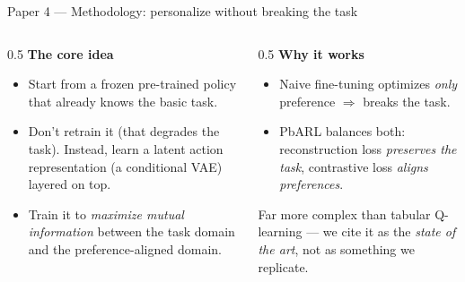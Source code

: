 \documentclass[aspectratio=169,10pt]{beamer}
\begin{document}
\begin{frame}{Paper 4 --- Methodology: personalize without breaking the task}
  \begin{columns}[T]
    \begin{column}{0.5\textwidth}
      \textbf{The core idea}
      \begin{itemize}\footnotesize
        \item Start from a \alert{frozen} pre-trained policy that already knows the basic task.
        \item Don't retrain it (that degrades the task). Instead, learn a \alert{latent action representation} (a conditional VAE) layered on top.
        \item Train it to \emph{maximize mutual information} between the task domain and the preference-aligned domain.
      \end{itemize}
    \end{column}
    \begin{column}{0.5\textwidth}
      \textbf{Why it works}
      \begin{itemize}\footnotesize
        \item Naive fine-tuning optimizes \emph{only} preference $\Rightarrow$ breaks the task.
        \item PbARL balances both: reconstruction loss \emph{preserves the task}, contrastive loss \emph{aligns preferences}.
      \end{itemize}
      \begin{block}{}
        \scriptsize Far more complex than tabular Q-learning --- we cite it as the \emph{state of the art}, not as something we replicate.
      \end{block}
    \end{column}
  \end{columns}
\end{frame}
\end{document}
